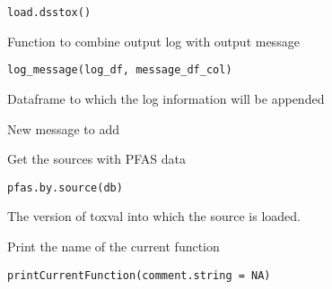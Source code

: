 \documentclass[letterpaper]{book}
\begin{document}
%
\begin{Usage}
\begin{verbatim}
load.dsstox()
\end{verbatim}
\end{Usage}
%
\begin{Description}\relax
Function to combine output log with output message
\end{Description}
%
\begin{Usage}
\begin{verbatim}
log_message(log_df, message_df_col)
\end{verbatim}
\end{Usage}
%
\begin{Arguments}
\begin{ldescription}
\item[\code{log\_df}] Dataframe to which the log information will be appended

\item[\code{message\_df\_col}] New message to add
\end{ldescription}
\end{Arguments}
%
\begin{Description}\relax
Get the sources with PFAS data
\end{Description}
%
\begin{Usage}
\begin{verbatim}
pfas.by.source(db)
\end{verbatim}
\end{Usage}
%
\begin{Arguments}
\begin{ldescription}
\item[\code{db}] The version of toxval into which the source is loaded.
\end{ldescription}
\end{Arguments}
%
\begin{Description}\relax
Print the name of the current function
\end{Description}
%
\begin{Usage}
\begin{verbatim}
printCurrentFunction(comment.string = NA)
\end{verbatim}
\end{Usage}
\end{document}

